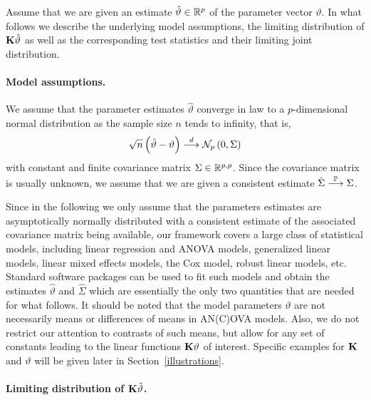 \documentclass[12pt]{article}
\begin{document}
Assume that we are given
an estimate $\hat{\vartheta} \in \mathbb{R}^p$ of the parameter
vector $\vartheta$. In what follows we describe the underlying model assumptions,
the limiting distribution of $\mathbf{K}\hat{\vartheta}$ as well as the 
corresponding test statistics and their limiting joint distribution.



\paragraph{Model assumptions.}

We assume that the parameter estimates $\hat{\vartheta}$ converge in law
to a $p$-dimensional normal distribution as the sample
size $n$ tends to infinity, that is,
\begin{eqnarray} \label{normality}
\sqrt{n}\left(\hat{\vartheta} - \vartheta\right) \stackrel{d}{\longrightarrow} \mathcal{N}_p\left(0, \Sigma\right)
\end{eqnarray}
with constant and finite covariance matrix $\Sigma \in \mathbb{R}^{p,p}$.
Since the covariance matrix is usually unknown, we assume
that we are given a consistent estimate $\hat{\Sigma} \stackrel{\mathbb{P}}{\longrightarrow} \Sigma$.

Since in the following we only assume that the parameters estimates are
asymptotically normally distributed with
a consistent estimate of the associated covariance matrix
being available, our
framework covers a large class of statistical models, including linear
regression and ANOVA models, generalized linear models, linear mixed
effects models, the Cox model, robust linear models, etc.
Standard software packages can be used to fit such models
and obtain the estimates $\hat{\vartheta}$ and $\hat{\Sigma}$ which
are essentially the only two quantities that are needed for what follows.
It should be noted that the model parameters $\vartheta$ are not necessarily
means or differences of means in AN(C)OVA models.
Also, we do not restrict our attention to contrasts of such means, but allow for
any set of constants leading to the linear functions $\mathbf{K} \vartheta$ of interest.
Specific examples for $\mathbf{K}$ and $\vartheta$ will be given later in Section~\ref{illustrations}.



\paragraph{Limiting distribution of $\mathbf{K}\hat{\vartheta}$.}
\end{document}
